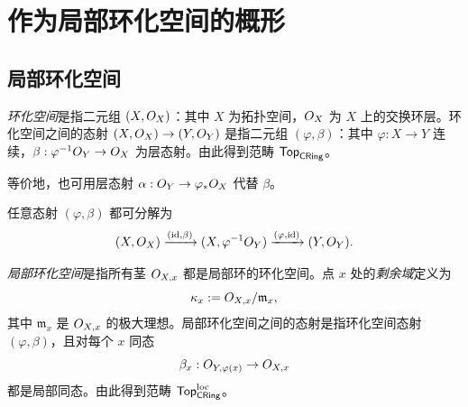 
\makeatletter
{}
\makeatother

\section{作为局部环化空间的概形}\label{sec:5}

\subsection{局部环化空间}\label{sec:5.1}

\begin{definition}\label{def:5.1.1}
\emph{环化空间}是指二元组 $(X,O_X)$：其中 $X$ 为拓扑空间，$O_X$ 为 $X$ 上的交换环层。环化空间之间的态射 $(X,O_X)\to(Y,O_Y)$ 是指二元组 $(\varphi,\beta)$：其中 $\varphi:X\to Y$ 连续，$\beta:\varphi^{-1}O_Y\to O_X$ 为层态射。由此得到范畴 $\mathsf{Top}_{\mathsf{CRing}}$。
\end{definition}

\begin{remark}\label{rem:5.1.2}
等价地，也可用层态射 $\alpha:O_Y\to\varphi_*O_X$ 代替 $\beta$。
\end{remark}

\begin{construction}\label{con:5.1.3}
任意态射 $(\varphi,\beta)$ 都可分解为
\[
(X,O_X)\xrightarrow{(\operatorname{id},\beta)}(X,\varphi^{-1}O_Y)\xrightarrow{(\varphi,\operatorname{id})}(Y,O_Y).
\]
\end{construction}

\begin{definition}\label{def:5.1.4}
\emph{局部环化空间}是指所有茎 $O_{X,x}$ 都是局部环的环化空间。点 $x$ 处的\emph{剩余域}定义为
\[
\kappa_x := O_{X,x}/\mathfrak m_x,
\]
其中 $\mathfrak m_x$ 是 $O_{X,x}$ 的极大理想。局部环化空间之间的态射是指环化空间态射 $(\varphi,\beta)$，且对每个 $x$ 同态
\[
\beta_x:O_{Y,\varphi(x)}\to O_{X,x}
\]
都是局部同态。由此得到范畴 $\mathsf{Top}^{\mathrm{loc}}_{\mathsf{CRing}}$。
\end{definition}

